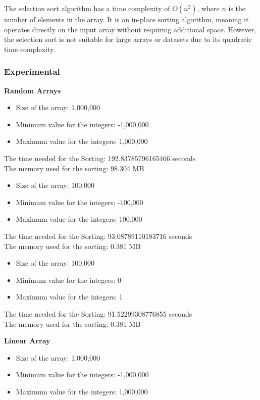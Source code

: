 \documentclass{article}
\begin{document}
The selection sort algorithm has a time complexity of $O(n^2)$, where $n$ is the number of elements in the array. It is an in-place sorting algorithm, meaning it operates directly on the input array without requiring additional space. However, the selection sort is not suitable for large arrays or datasets due to its quadratic time complexity.

\subsubsection{Experimental}

\textbf{Random Arrays}

\begin{itemize}
    \item Size of the array: 1,000,000
    \item Minimum value for the integers: -1,000,000
    \item Maximum value for the integers: 1,000,000
\end{itemize}

The time needed for the Sorting: 192.83785796165466 seconds\\
The memory used for the sorting: 98.304 MB


\begin{itemize}
    \item Size of the array: 100,000
    \item Minimum value for the integers: -100,000
    \item Maximum value for the integers: 100,000
\end{itemize}

The time needed for the Sorting: 93.08789110183716 seconds\\
The memory used for the sorting: 0.381 MB


\begin{itemize}
    \item Size of the array: 100,000
    \item Minimum value for the integers: 0
    \item Maximum value for the integers: 1
\end{itemize}

The time needed for the Sorting: 91.52299308776855 seconds\\
The memory used for the sorting: 0.381 MB

\textbf{Linear Array}

\begin{itemize}
    \item Size of the array: 1,000,000
    \item Minimum value for the integers: -1,000,000
    \item Maximum value for the integers: 1,000,000
\end{itemize}
\end{document}
